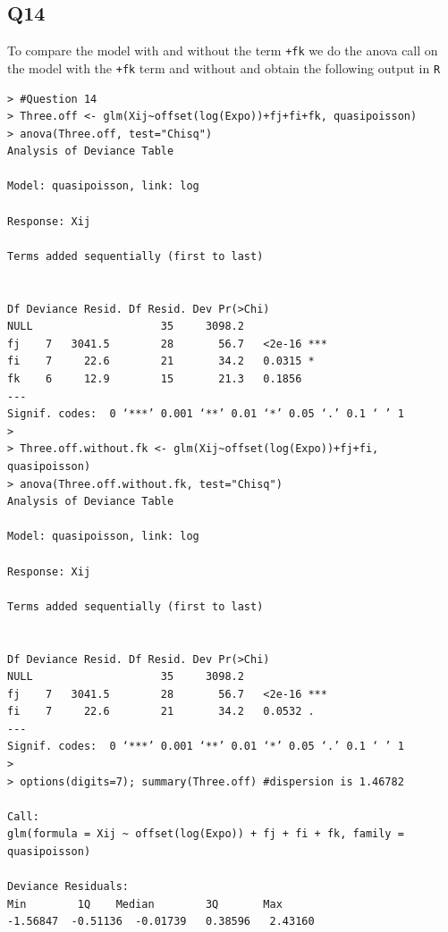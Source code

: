 \documentclass[11pt]{article}
\begin{document}
\subsection*{Q14}
To compare the model with and without the term \verb|+fk| we do the anova call on the model with the \verb|+fk| term and without and obtain the following output in \verb|R|

\begin{verbatim}
> #Question 14
> Three.off <- glm(Xij~offset(log(Expo))+fj+fi+fk, quasipoisson)
> anova(Three.off, test="Chisq")
Analysis of Deviance Table

Model: quasipoisson, link: log

Response: Xij

Terms added sequentially (first to last)


Df Deviance Resid. Df Resid. Dev Pr(>Chi)    
NULL                    35     3098.2             
fj    7   3041.5        28       56.7   <2e-16 ***
fi    7     22.6        21       34.2   0.0315 *  
fk    6     12.9        15       21.3   0.1856    
---
Signif. codes:  0 ‘***’ 0.001 ‘**’ 0.01 ‘*’ 0.05 ‘.’ 0.1 ‘ ’ 1
> 
> Three.off.without.fk <- glm(Xij~offset(log(Expo))+fj+fi, quasipoisson)
> anova(Three.off.without.fk, test="Chisq")
Analysis of Deviance Table

Model: quasipoisson, link: log

Response: Xij

Terms added sequentially (first to last)


Df Deviance Resid. Df Resid. Dev Pr(>Chi)    
NULL                    35     3098.2             
fj    7   3041.5        28       56.7   <2e-16 ***
fi    7     22.6        21       34.2   0.0532 .  
---
Signif. codes:  0 ‘***’ 0.001 ‘**’ 0.01 ‘*’ 0.05 ‘.’ 0.1 ‘ ’ 1
> 
> options(digits=7); summary(Three.off) #dispersion is 1.46782

Call:
glm(formula = Xij ~ offset(log(Expo)) + fj + fi + fk, family = quasipoisson)

Deviance Residuals: 
Min        1Q    Median        3Q       Max  
-1.56847  -0.51136  -0.01739   0.38596   2.43160  


\end{verbatim}
\end{document}
